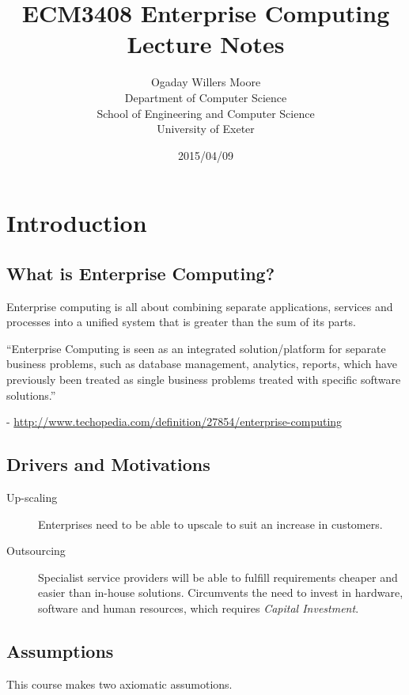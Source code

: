 \documentclass[11pt]{article}
\title{ECM3408 Enterprise Computing Lecture Notes}
\author{Ogaday Willers Moore\\        %
Department of Computer Science\\
School of Engineering and Computer Science\\
University of Exeter}
\date{2015/04/09}
\begin{document}
\maketitle

\tableofcontents

\section{Introduction}
\label{sec:intro}

\subsection{What is Enterprise Computing?}
\label{sec:1.1}
Enterprise computing is all about combining separate applications, services and processes into a unified system that is greater than the sum of its parts.
\begin{displayquote}
``Enterprise Computing is seen as an integrated solution/platform for separate business problems, such as database management, analytics, reports, which have previously been treated as single business problems treated with specific software solutions.''
\end{displayquote}

- \url{http://www.techopedia.com/definition/27854/enterprise-computing}

\subsection{Drivers and Motivations}
\label{sec:1.2}

\begin{description}
\item[Up-scaling] Enterprises need to be able to upscale to suit an increase in customers.
\item[Outsourcing] Specialist service providers will be able to fulfill requirements cheaper and easier than in-house solutions. Circumvents the need to invest in hardware, software and human resources, which requires \textit{Capital Investment}.
\end{description}

\subsection{Assumptions}

This course makes two axiomatic assumotions.
\end{document}
